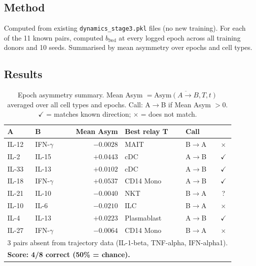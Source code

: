 \documentclass[11pt,a4paper]{article}
\begin{document}
\subsection{Method}

Computed from existing \texttt{dynamics\_stage3.pkl} files (no new training).
For each of the 11 known pairs, computed $b_{\text{fwd}}$ at every logged
epoch across all training donors and 10 seeds. Summarised by mean asymmetry
over epochs and cell types.

\subsection{Results}

\begin{table}[H]
\centering
\caption{%
    Epoch asymmetry summary. Mean Asym $= \overline{\text{Asym}(A\to B, T, t)}$
    averaged over all cell types and epochs. Call: A$\to$B if Mean Asym $> 0$.
    $\checkmark$ = matches known direction; $\times$ = does not match.
}
\begin{tabular}{llrll c}
\toprule
\textbf{A} & \textbf{B} & \textbf{Mean Asym} & \textbf{Best relay T} & \textbf{Call} & \\
\midrule
IL-12      & IFN-$\gamma$ & $-0.0028$ & MAIT       & B$\to$A & \textcolor{wrong}{$\times$} \\
IL-2       & IL-15        & $+0.0443$ & cDC        & A$\to$B & \textcolor{correct}{$\checkmark$} \\
IL-33      & IL-13        & $+0.0102$ & cDC        & A$\to$B & \textcolor{correct}{$\checkmark$} \\
IL-18      & IFN-$\gamma$ & $+0.0537$ & CD14 Mono  & A$\to$B & \textcolor{correct}{$\checkmark$} \\
IL-21      & IL-10        & $-0.0040$ & NKT        & B$\to$A & \textcolor{marginal}{?} \\
IL-10      & IL-6         & $-0.0210$ & ILC        & B$\to$A & \textcolor{wrong}{$\times$} \\
IL-4       & IL-13        & $+0.0223$ & Plasmablast & A$\to$B & \textcolor{correct}{$\checkmark$} \\
IL-27      & IFN-$\gamma$ & $-0.0064$ & CD14 Mono  & B$\to$A & \textcolor{wrong}{$\times$} \\
\bottomrule
\multicolumn{6}{l}{\small 3 pairs absent from trajectory data (IL-1-beta, TNF-alpha, IFN-alpha1).} \\
\multicolumn{6}{l}{\small \textbf{Score: 4/8 correct (50\% = chance).}} \\
\end{tabular}
\label{tab:epoch_asym}
\end{table}
\end{document}
